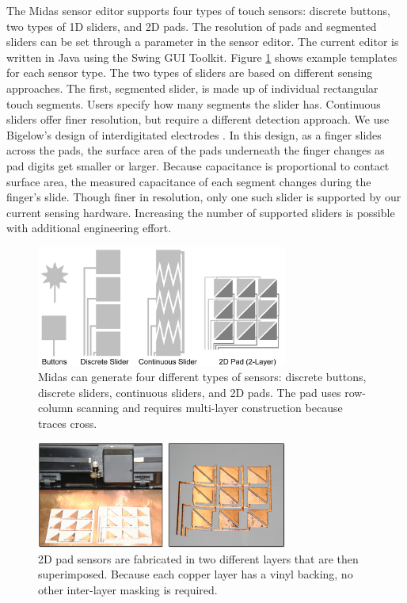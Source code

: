 The Midas sensor editor supports four types of touch sensors:
discrete buttons, two types of 1D sliders, and 2D pads. The
resolution of pads and segmented sliders can be set through a
parameter in the sensor editor. The current editor is written in
Java using the Swing GUI Toolkit. Figure \ref{fig:midas-templates} shows example
templates for each sensor type. The two types of sliders are
based on different sensing approaches. The first, segmented
slider, is made up of individual rectangular touch segments.
Users specify how many segments the slider has. Continuous
sliders offer finer resolution, but require a different detection
approach. We use Bigelow's design of interdigitated electrodes
\cite{bigelow-interdigitated}. In this design, as a finger slides across the pads,
the surface area of the pads underneath the finger changes as
pad digits get smaller or larger. Because capacitance is proportional
to contact surface area, the measured capacitance of
each segment changes during the finger's slide. Though finer
in resolution, only one such slider is supported by our current
sensing hardware. Increasing the number of supported
sliders is possible with additional engineering effort.


\begin{figure}
\centering
\includegraphics[width=3.25in]{figures/midas/pad-templates.png}
\caption{Midas can generate four different types of sensors: discrete buttons, discrete sliders, continuous sliders, and 2D pads. The pad uses row-column scanning and requires multi-layer construction because traces cross.} 
\label{fig:midas-templates}
\end{figure}

\begin{figure}
\centering
\includegraphics[width=3.25in]{figures/midas/2dgrid.jpg}
\caption{2D pad sensors are fabricated in two different layers that are then superimposed. Because each copper layer has a vinyl backing, no other inter-layer masking is required.} 
\label{fig:midas-layering}
\end{figure}

